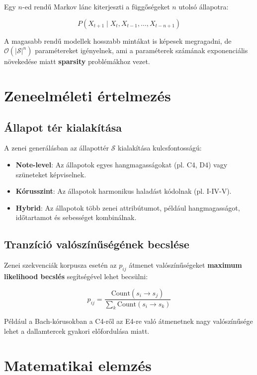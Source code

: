Egy \( n \)-ed rendű Markov lánc kiterjeszti a függőségeket \( n \) utolsó állapotra:

\[
P(X_{t+1} \mid X_t, X_{t-1}, \dots, X_{t-n+1})
\]

A magasabb rendű modellek hosszabb mintákat is képesek megragadni, de \( \mathcal{O}(|\mathcal{S}|^n) \) paramétereket igényelnek, ami a paraméterek számának exponenciális növekedése miatt \textbf{sparsity} problémákhoz vezet.

\section{Zeneelméleti értelmezés}

\subsection{Állapot tér kialakítása}

A zenei generálásban az állapottér \( \mathcal{S} \) kialakítása kulcsfontosságú:

\begin{itemize}
    \item \textbf{Note-level}: Az állapotok egyes hangmagasságokat (pl. C4, D4) vagy szüneteket képviselnek.
    \item \textbf{Kórusszint}: Az állapotok harmonikus haladást kódolnak (pl. I-IV-V).
    \item \textbf{Hybrid}: Az állapotok több zenei attribútumot, például hangmagasságot, időtartamot és sebességet kombinálnak.
\end{itemize}

\subsection{Tranzíció valószínűségének becslése}

Zenei szekvenciák korpusza esetén az \( p_{ij} \) átmenet valószínűségeket \textbf{maximum likelihood becslés} segítségével lehet becsülni:

\[
p_{ij} = \frac{\text{Count}(s_i \rightarrow s_j)}{\sum_{k} \text{Count}(s_i \rightarrow s_k)}
\]

Például a Bach-kórusokban a C4-ről az E4-re való átmenetnek nagy valószínűsége lehet a dallamtercek gyakori előfordulása miatt.

\section{Matematikai elemzés}

